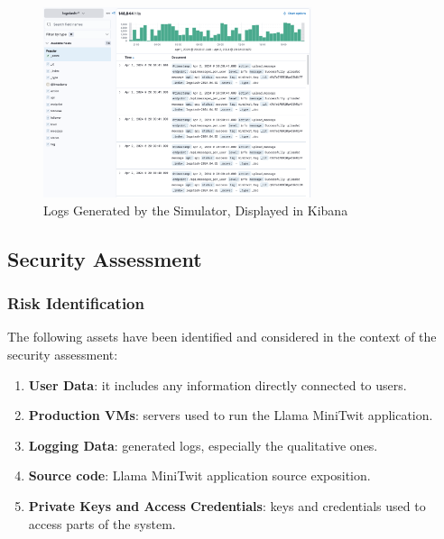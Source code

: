 \documentclass{article}
\begin{document}
\begin{figure}[ht]
    \centering
    \includegraphics[width=0.7\textwidth]{./images/kibana_screenshot.png} 
    \caption{Logs Generated by the Simulator, Displayed in Kibana}
    \label{fig:kibana_screenshot}
\end{figure}

\subsection{Security Assessment}

\subsubsection{Risk Identification}
The following assets have been identified and considered in the context of the security assessment:

\begin{enumerate}
\item \textbf{User Data}: it includes any information directly connected to users.
\item \textbf{Production VMs}: servers used to run the Llama MiniTwit application.
\item \textbf{Logging Data}: generated logs, especially the qualitative ones.
\item \textbf{Source code}: Llama MiniTwit application source exposition.
\item \textbf{Private Keys and Access Credentials}: keys and credentials used to access parts of the system.
\end{enumerate}
\end{document}
